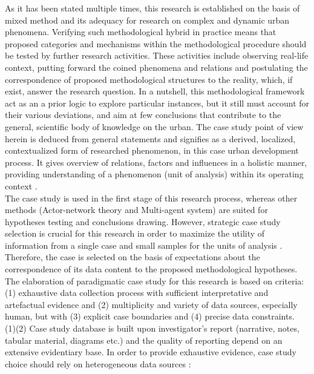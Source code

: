 \documentclass[11pt]{report}
\begin{document}
As it has been stated multiple times, this research is established on the basis of mixed method and its adequacy for research on complex and dynamic urban phenomena. Verifying such methodological hybrid in practice means that proposed categories and mechanisms within the methodological procedure should be tested by further research activities. These activities include observing real-life context, putting forward the coined phenomena and relations and postulating the correspondence of proposed methodological structures to the reality, which, if exist, answer the research question. In a nutshell, this methodological framework act as an a prior logic to explore particular instances, but it still must account for their various deviations, and aim at few conclusions that contribute to the general, scientific body of knowledge on the urban. The case study point of view herein is deduced from general statements and signifies as a derived, localized, contextualized form of researched phenomenon, in this case urban development process. It gives overview of relations, factors and influences in a holistic manner, providing understanding of a phenomenon (unit of analysis) within its operating context .
\\
The case study is used in the first stage of this research process, whereas other methods (Actor-network theory and Multi-agent system) are suited for hypotheses testing and conclusions drawing. However, strategic case study selection is crucial for this research in order to maximize the utility of information from a single case and small samples for the units of analysis . Therefore, the case is selected on the basis of expectations about the correspondence of its data content to the proposed methodological hypotheses. The elaboration of paradigmatic case study for this research is based on  criteria: (1) exhaustive data collection process with sufficient interpretative and artefactual evidence and (2) multiplicity and variety of data sources, especially human, but with (3) explicit case boundaries and (4) precise data constraints.
\\
(1)(2) Case study database is built upon investigator's report (narrative, notes, tabular material, diagrams etc.) and the quality of reporting depend on an extensive evidentiary base. In order to provide exhaustive evidence, case study choice should rely on heterogeneous data sources :
\end{document}
